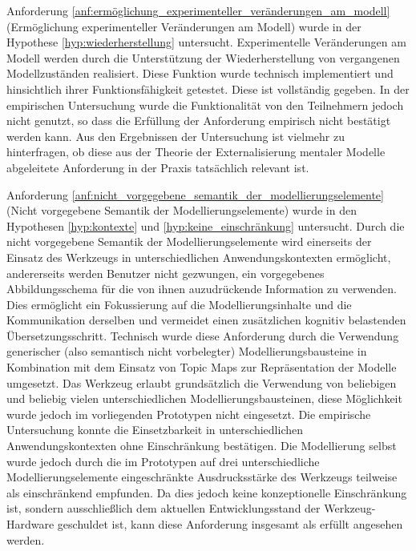 Anforderung \ref{anf:ermöglichung_experimenteller_veränderungen_am_modell} (Ermöglichung experimenteller Veränderungen am Modell) wurde in der Hypothese \ref{hyp:wiederherstellung} untersucht. Experimentelle Veränderungen am Modell werden durch die Unterstützung der Wiederherstellung von vergangenen Modellzuständen realisiert. Diese Funktion wurde technisch implementiert und hinsichtlich ihrer Funktionsfähigkeit getestet. Diese ist vollständig gegeben. In der empirischen Untersuchung wurde die Funktionalität von den Teilnehmern jedoch nicht genutzt, so dass die Erfüllung der Anforderung empirisch nicht bestätigt werden kann. Aus den Ergebnissen der Untersuchung ist vielmehr zu hinterfragen, ob diese aus der Theorie der Externalisierung mentaler Modelle abgeleitete Anforderung in der Praxis tatsächlich relevant ist.

Anforderung \ref{anf:nicht_vorgegebene_semantik_der_modellierungselemente} (Nicht vorgegebene Semantik der Modellierungselemente) wurde in den Hypothesen \ref{hyp:kontexte} und \ref{hyp:keine_einschränkung} untersucht. Durch die nicht vorgegebene Semantik der Modellierungselemente wird einerseits der Einsatz des Werkzeugs in unterschiedlichen Anwendungskontexten ermöglicht, andererseits werden Benutzer nicht gezwungen, ein vorgegebenes Abbildungsschema für die von ihnen auzudrückende Information zu verwenden. Dies ermöglicht ein Fokussierung auf die Modellierungsinhalte und die Kommunikation derselben und vermeidet einen zusätzlichen kognitiv belastenden Übersetzungsschritt. Technisch wurde diese Anforderung durch die Verwendung generischer (also semantisch nicht vorbelegter) Modellierungsbausteine in Kombination mit dem Einsatz von Topic Maps zur Repräsentation der Modelle umgesetzt. Das Werkzeug erlaubt grundsätzlich die Verwendung von beliebigen und beliebig vielen unterschiedlichen Modellierungsbausteinen, diese Möglichkeit wurde jedoch im vorliegenden Prototypen nicht eingesetzt. Die empirische Untersuchung konnte die Einsetzbarkeit in unterschiedlichen Anwendungskontexten ohne Einschränkung bestätigen. Die Modellierung selbst wurde jedoch durch die im Prototypen auf drei unterschiedliche Modellierungselemente eingeschränkte Ausdrucksstärke des Werkzeugs teilweise als einschränkend empfunden. Da dies jedoch keine konzeptionelle Einschränkung ist, sondern ausschließlich dem aktuellen Entwicklungsstand der Werkzeug-Hardware geschuldet ist, kann diese Anforderung insgesamt als erfüllt angesehen werden. 

